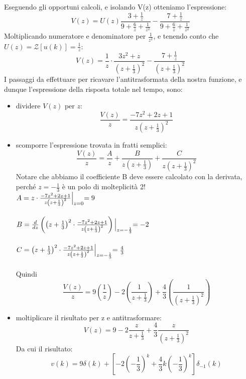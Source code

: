 \documentclass[12pt,a4paper]{article}
\begin{document}
\begin{enumerate}
\[		\]
		Eseguendo gli opportuni calcoli, e isolando V(z) otteniamo l'espressione:
		\[
			V(z) = U(z) \frac{3+\frac{1}{z}}{9+\frac{6}{z} + \frac{1}{z^2}} - \frac{7 + \frac{1}{z}}{9 + \frac{6}{z} + \frac{1}{z^2}}
		\]
		Moltiplicando numeratore e denominatore per $\frac{1}{z^2}$, e tenendo conto che $U(z) = \mathcal{Z}\left[u(k)\right] = \frac{1}{z}$:
		\[
			V(z) = \frac{1}{z} \cdot \frac{3z^2+z}{\left(z+\frac{1}{3}\right)^2} - \frac{7 + \frac{1}{z}}{\left(z+\frac{1}{3}\right)^2}
		\]
		I passaggi da effettuare per ricavare l'antitrasformata della nostra funzione, e dunque l'espressione della risposta totale nel tempo, sono:
		\begin{itemize}
			\item dividere $V(z)$ per $z$:
				\[
					\frac{V(z)}{z} = \frac{-7z^2+2z+1}{z\left(z+\frac{1}{3}\right)^2}
				\]
			\item scomporre l'espressione trovata in fratti semplici:
				\[
					\frac{V(z)}{z} = \frac{A}{z} + \frac{B}{z\left(z+\frac{1}{3}\right)} + \frac{C}{z\left(z+\frac{1}{3}\right)^2}
				\]
				Notare che abbiamo il coefficiente B deve essere calcolato con la derivata, perché $z = -\frac{1}{3}$ \`e un polo di molteplicit\`a 2!\\
				$A = z \cdot \frac{-7z^2+2z+1}{z\left(z+\frac{1}{3}\right)^2} \Bigl\lvert_{z = 0} = 9$ \\ \\
				$B = \frac{d}{dz}\left(\left( z + \frac{1}{3}\right)^2 \cdot \frac{-7z^2+2z+1}{z\left(z+\frac{1}{3}\right)^2} \right)\Bigl\lvert_{z = -\frac{1}{3}}=-2$\\ \\
				$C = \left(z + \frac{1}{3}\right)^2 \cdot \frac{-7z^2+2z+1}{z\left(z+\frac{1}{3}\right)^2} \Bigl\lvert_{z = -\frac{1}{3}} = \frac{4}{3}$\\ \\
				Quindi
				\[
					\frac{V(z)}{z} = 9\left(\frac{1}{z}\right) - 2\left(\frac{1}{z+\frac{1}{3}}\right) +
					\frac{4}{3}\left(\frac{1}{\left(z + \frac{1}{3}\right)^2}\right)
				\]
			\item moltiplicare il risultato per z e antitrasformare:
			\[
				V(z) = 9 - 2\frac{z}{z+\frac{1}{3}} + \frac{4}{3}\frac{z}{\left(z+\frac{1}{3}\right)^2}
			\]
			Da cui il risultato:
			\[
				v(k) = 9\delta (k) + \left[-2\left(-\frac{1}{3}\right)^k + \frac{4}{3}k\left(-\frac{1}{3}\right)^k\right]\delta_{-1}(k)
			\]
		\end{itemize}
	\end{enumerate}
	\newpage
\end{document}
